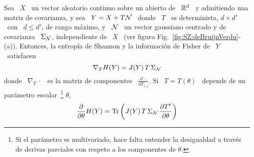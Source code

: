 \begin{teorema}
  Sea \ $X$ \  un vector aleatorio continuo sobre un abierto  de \ $\mathbb{R}^d$ \ y
  admitiendo una matriz de covarianza, y sea \  $Y = X + T \mathcal{N}$ \ donde \ $T$
  \ es determinista, $d  \times d'$ \ con \ $ d \le d'$,  de rango m\'aximo, y \
  $\mathcal{N}$ \  un vector  gaussiano centrado y  de covarianza  \ $\Sigma_{\mathcal{N}}$,
  independiente  de \  $X$ \  (ver  figura Fig.~\ref{fig:SZ:deBruijnVerdu}-(a)).
  Entonces, la  entrop\'ia de Shannon  y la informaci\'on  de Fisher de \  $Y$ \
  satisfacen
  \[
  \nabla_T H(Y) = J(Y) \, T \, \Sigma_{\mathcal{N}}
  \]
  donde \ $\nabla_T \, \cdot$ \ es la matriz de componentes \ $\frac{\partial \,
    \cdot}{\partial T_{i,j}}$.  Si \ $T = T(\theta)$ \ depende de un par\'ametro
  escalar~\footnote{Si el  par\'ametro es  multivariado, hace falta  entender la
    desigualdad a trav\'es de derivas parciales con respeto a los componentes de
    $\theta$.}  $\theta$,
  \[
  \frac{\partial}{\partial \theta}  H(Y) = \operatorname{Tr}\left( J(Y) \,  T \, \Sigma_{\mathcal{N}}
    \, \frac{\partial T^t}{\partial \theta} \right)
  \]
\end{teorema}
%
